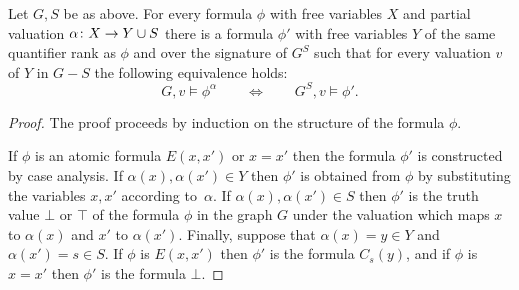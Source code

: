 \begin{lemma}\label{lem:remove-s}Let $G,S$ be as above.	
For every formula $\phi$ with free variables $X$ and partial valuation $\alpha\colon X\to Y\cup S$
there is a formula $\phi'$ with free variables $Y$
of the same quantifier rank as $\phi$ and over the signature of $G^S$
 such that for every valuation $v$ of $Y$ in $G-S$
the following equivalence holds:
$$G,v\models\phi^{\alpha}\qquad\iff\qquad G^S,v\models\phi'.$$
\end{lemma}
\begin{proof}
The proof proceeds by induction on the structure of the formula $\phi$. 

If $\phi$ is an atomic formula $E(x,x')$ or $x=x'$ then the formula $\phi'$ is constructed by case analysis. If $\alpha(x),\alpha(x')\in Y$ then $\phi'$
is obtained from $\phi$ by substituting the variables $x,x'$ according to~$\alpha$. If  $\alpha(x),\alpha(x')\in S$ then $\phi'$ is the truth value $\bot$ or $\top$ of 
the formula $\phi$ in the graph $G$ under the valuation which maps $x$ to $\alpha(x)$ and $x'$ to $\alpha(x')$. Finally, suppose that $\alpha(x)=y\in Y$ and $\alpha(x')=s\in S$. If $\phi$ is $E(x,x')$ then $\phi'$ is the formula $C_{s}(y)$, and if $\phi$ is $x=x'$ then $\phi'$ is the formula $\bot$.
 
 

%
%






\end{proof}

